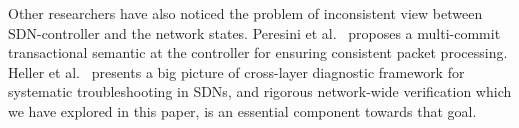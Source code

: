 Other researchers have also noticed the problem of inconsistent view between SDN-controller and the network states. Peresini et al.~\cite{OFCPP} proposes a multi-commit transactional semantic at the controller for ensuring consistent packet processing. Heller et al.~\cite{sdnlayering} presents a big picture of cross-layer diagnostic framework for systematic troubleshooting in SDNs, and rigorous network-wide verification which we have explored in this paper, is an essential component towards that goal.


%
%
